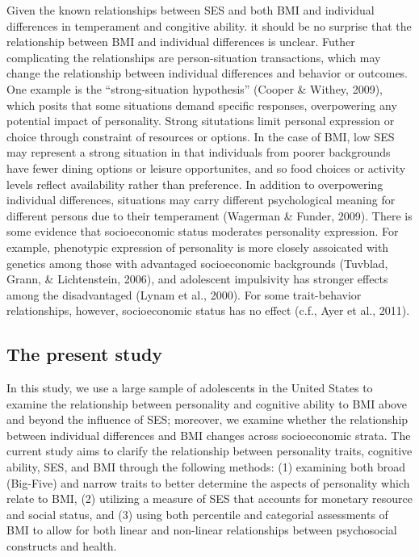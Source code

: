 \documentclass[man]{apa6}
\begin{document}
Given the known relationships between SES and both BMI and individual differences in temperament and congitive ability. it should be no surprise that the relationship between BMI and individual differences is unclear. Futher complicating the relationships are person-situation transactions, which may change the relationship between individual differences and behavior or outcomes. One example is the \enquote{strong-situation hypothesis} (Cooper \& Withey, 2009), which posits that some situations demand specific responses, overpowering any potential impact of personality. Strong situtations limit personal expression or choice through constraint of resources or options. In the case of BMI, low SES may represent a strong situation in that individuals from poorer backgrounds have fewer dining options or leisure opportunites, and so food choices or activity levels reflect availability rather than preference. In addition to overpowering individual differences, situations may carry different psychological meaning for different persons due to their temperament (Wagerman \& Funder, 2009). There is some evidence that socioeconomic status moderates personality expression. For example, phenotypic expression of personality is more closely assoicated with genetics among those with advantaged socioeconomic backgrounds (Tuvblad, Grann, \& Lichtenstein, 2006), and adolescent impulsivity has stronger effects among the disadvantaged (Lynam et al., 2000). For some trait-behavior relationships, however, socioeconomic status has no effect (c.f., Ayer et al., 2011).

\hypertarget{the-present-study}{%
\subsection{The present study}\label{the-present-study}}

In this study, we use a large sample of adolescents in the United States to examine the relationship between personality and cognitive ability to BMI above and beyond the influence of SES; moreover, we examine whether the relationship between individual differences and BMI changes across socioeconomic strata. The current study aims to clarify the relationship between personality traits, cognitive ability, SES, and BMI through the following methods: (1) examining both broad (Big-Five) and narrow traits to better determine the aspects of personality which relate to BMI, (2) utilizing a measure of SES that accounts for monetary resource and social status, and (3) using both percentile and categorial assessments of BMI to allow for both linear and non-linear relationships between psychosocial constructs and health.
\end{document}
